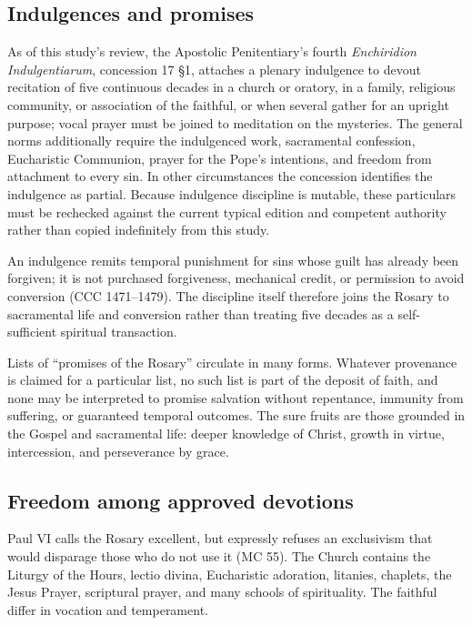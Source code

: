 \subsection{Indulgences and promises}

As of this study's review, the Apostolic Penitentiary's fourth \emph{Enchiridion Indulgentiarum}, concession 17 \S1, attaches a plenary indulgence to devout recitation of five continuous decades in a church or oratory, in a family, religious community, or association of the faithful, or when several gather for an upright purpose; vocal prayer must be joined to meditation on the mysteries. The general norms additionally require the indulgenced work, sacramental confession, Eucharistic Communion, prayer for the Pope's intentions, and freedom from attachment to every sin. In other circumstances the concession identifies the indulgence as partial. Because indulgence discipline is mutable, these particulars must be rechecked against the current typical edition and competent authority rather than copied indefinitely from this study.

An indulgence remits temporal punishment for sins whose guilt has already been forgiven; it is not purchased forgiveness, mechanical credit, or permission to avoid conversion (CCC 1471--1479). The discipline itself therefore joins the Rosary to sacramental life and conversion rather than treating five decades as a self-sufficient spiritual transaction.

Lists of ``promises of the Rosary'' circulate in many forms. Whatever provenance is claimed for a particular list, no such list is part of the deposit of faith, and none may be interpreted to promise salvation without repentance, immunity from suffering, or guaranteed temporal outcomes. The sure fruits are those grounded in the Gospel and sacramental life: deeper knowledge of Christ, growth in virtue, intercession, and perseverance by grace.

\subsection{Freedom among approved devotions}

Paul VI calls the Rosary excellent, but expressly refuses an exclusivism that would disparage those who do not use it (MC 55). The Church contains the Liturgy of the Hours, lectio divina, Eucharistic adoration, litanies, chaplets, the Jesus Prayer, scriptural prayer, and many schools of spirituality. The faithful differ in vocation and temperament.

